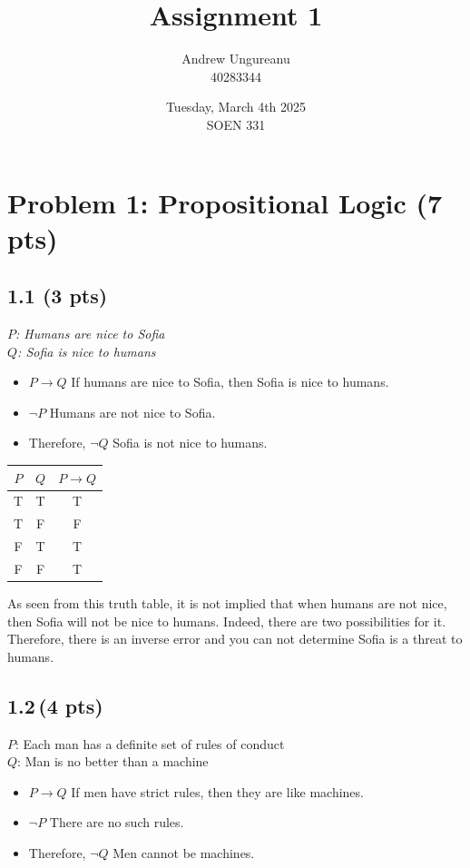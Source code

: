 \documentclass[12pt]{article}
\title{Assignment 1 \\\vspace{1in}}
\author{Andrew Ungureanu \\
        40283344\\\vspace{1in}}
\date{Tuesday, March 4th 2025\\
            SOEN 331}
\begin{document}
\maketitle

\newpage
\section*{Problem 1: Propositional Logic (7 pts)}

\subsection*{1.1 (3 pts)}
\textit{$P$: Humans are nice to Sofia\\
$Q$: Sofia is nice to humans}
\begin{itemize}

    \item  $P \rightarrow Q$ If humans are nice to Sofia, then Sofia is nice to humans.
    \item $\neg P$ Humans are not nice to Sofia.
    \item Therefore, $\neg Q$ Sofia is not nice to humans.
\end{itemize}
\begin{center}
    \begin{tabular}{|c|c|c|}
        \hline
        $P$ & $Q$ & $P \rightarrow Q$ \\
        \hline
        T & T & T \\
        T & F & F \\
        F & T & T \\
        F & F & T \\
        \hline
    \end{tabular}
\end{center}

As seen from this truth table, it is not implied that when humans are not nice, then Sofia will not be nice to humans. Indeed, there are two possibilities for it. Therefore, there is an inverse error and you can not determine Sofia is a threat to humans.


\subsection*{1.2\,(4 pts)}
\textit{}{$P$: Each man has a definite set of rules of conduct
\\$Q$: Man is no better than a machine}
\begin{itemize}

    \item  $P \rightarrow Q$ If men have strict rules, then they are like machines.
    \item $\neg P$ There are no such rules.
    \item Therefore, $\neg Q$ Men cannot be machines.
\end{itemize}
\end{document}
